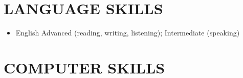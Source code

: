\documentclass[10pt,a4paper,sans]{moderncv} %
\begin{document}
\section{LANGUAGE SKILLS}

\begin{itemize}
	\item English \hspace{6 pt} Advanced (reading, writing, listening); Intermediate (speaking)
\end{itemize} 

\section{COMPUTER SKILLS}

\vspace{1em}
\end{document}

